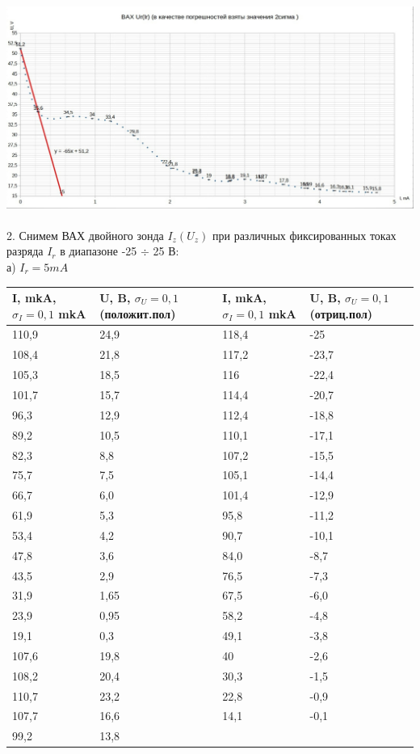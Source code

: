 \documentclass[11pt]{article}
\begin{document}
\includegraphics[width = 19cm]{vahk}\\
\\
2. Снимем ВАХ двойного зонда $I_z(U_z)$ при различных фиксированных токах разряда $I_r$ в диапазоне -25 $\div$ 25 В:\\
а) $I_r = 5 mA$\\
\begin{tabular}{|l|l|l|l|}
\hline
I, mkA, $\sigma_I = 0,1$ mkA & U, B, $\sigma_U = 0,1$ (положит.пол) & I, mkA, $\sigma_I = 0,1$ mkA & U, B, $\sigma_U = 0,1$ (отриц.пол)\\
\hline
110,9 & 24,9 &118,4 &-25
\\
\hline
108,4 & 21,8 & 117,2 & -23,7
\\
\hline
105,3 & 18,5 & 116 & -22,4
\\
\hline
101,7 & 15,7 & 114,4 & -20,7
\\
\hline
96,3 & 12,9 & 112,4 & -18,8
\\
\hline
89,2 & 10,5 & 110,1 & -17,1
\\
\hline
82,3 & 8,8 & 107,2 & -15,5
\\
\hline
75,7 & 7,5 & 105,1 & -14,4
\\
\hline
66,7 & 6,0 & 101,4 & -12,9
\\
\hline
61,9 & 5,3 & 95,8 & -11,2
\\
\hline
53,4 & 4,2 & 90,7 & -10,1
\\
\hline
47,8 & 3,6 & 84,0 & -8,7
\\
\hline
43,5 & 2,9 & 76,5 & -7,3
\\
\hline
31,9 & 1,65 & 67,5 & -6,0
\\
\hline
23,9 & 0,95 & 58,2 & -4,8
\\
\hline
19,1 & 0,3 & 49,1 & -3,8
\\
\hline
107,6 & 19,8 & 40 & -2,6
\\
\hline
108,2 & 20,4 & 30,3 & -1,5
\\
\hline
110,7 & 23,2 & 22,8 & -0,9
\\
\hline
107,7 & 16,6 & 14,1 & -0,1
\\
\hline
99,2 & 13,8 & &
\\
\hline

\end{tabular}
\end{document}
